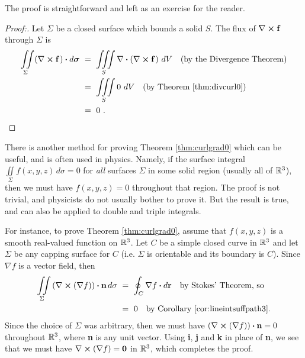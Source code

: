 The proof is straightforward and left as an exercise for the reader.
\newpage
{}
\begin{proofbar}\vspace{-3mm}\begin{proof}[Proof:]
 Let $\Sigma$ be a closed surface which bounds a solid $S$. The flux of $\nabla \bm{\times} \textbf{f}$
 through $\Sigma$ is
 \begin{align*}
  \iint\limits_{\Sigma} \Dotprod{(\Crossprod{\nabla}{\textbf{f}}\,)}{d\bm{\sigma}} ~&=~
   \iiint\limits_{S} \Dotprod{\nabla}{(\Crossprod{\nabla}{\textbf{f}}\,)} ~dV\quad\text{(by the Divergence Theorem)}\\
   &=~ \iiint\limits_{S} 0 ~dV \quad\text{(by Theorem \ref{thm:divcurl0})}\\
   &=~ 0 ~.\hfill\qedhere
 \end{align*}
\end{proof}\vspace{-3mm}\end{proofbar}

There is another method for proving Theorem \ref{thm:curlgrad0} which can be useful, and is often used in physics.
Namely, if the surface integral $\iint\limits_{\Sigma} f(x,y,z)\,d\sigma = 0$
for \emph{all} surfaces $\Sigma$ in some solid region (usually all of $\mathbb{R}^{3}$), then we must have $f(x,y,z) = 0$
throughout that region. The proof is not trivial, and physicists do not usually bother to prove it. But the result is
true, and can also be applied to double and triple integrals.

For instance, to prove Theorem \ref{thm:curlgrad0}, assume that $f(x,y,z)$ is a smooth real-valued function on
$\mathbb{R}^{3}$. Let $C$ be a simple closed curve in $\mathbb{R}^{3}$ and let $\Sigma$ be any capping surface for $C$ (i.e.
$\Sigma$ is orientable and its boundary is $C$). Since $\nabla f$ is a vector field, then
\begin{align*}
 \iint\limits_{\Sigma} \left( \nabla \bm{\times} (\nabla f) \right)  \bm{\cdot} \textbf{n}\,d\sigma ~&=~
  \oint_{C}\nabla f \bm{\cdot} d\textbf{r} \quad\text{by Stokes' Theorem, so}\\
 &=~ 0 \quad\text{by Corollary \ref{cor:lineintsuffpath3}.}
\end{align*}
Since the choice of $\Sigma$ was arbitrary, then we must have $(\nabla \bm{\times} (\nabla f)) \bm{\cdot} \textbf{n}
= 0$ throughout $\mathbb{R}^{3}$, where \textbf{n} is any unit vector. Using \textbf{i}, \textbf{j} and \textbf{k} in place of
\textbf{n}, we see that we must have $\nabla \bm{\times} (\nabla f) = \textbf{0}$ in $\mathbb{R}^{3}$, which completes the
proof.

